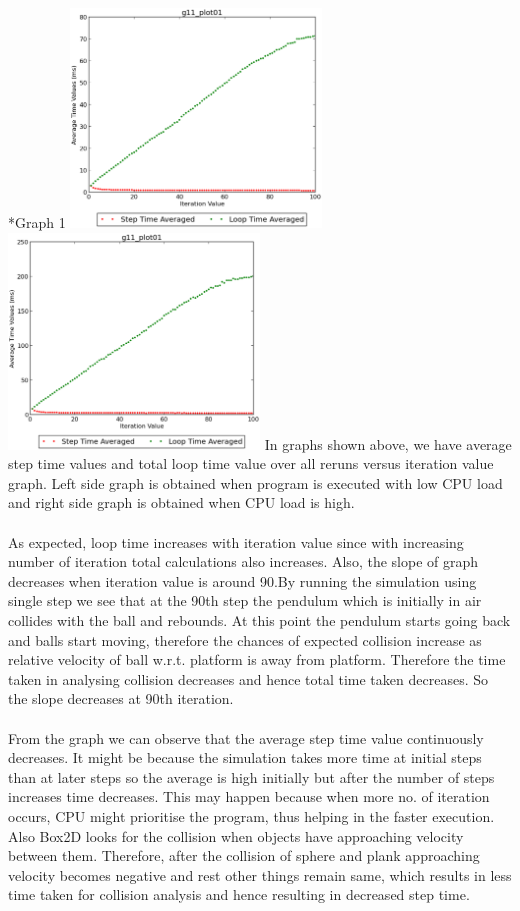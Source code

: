 \documentclass[11pt]{article}
\begin{document}
\begin{subsection}*{Graph 1}
\includegraphics[width=0.5\textwidth,keepaspectratio]{1.eps} \includegraphics[width=0.5\textwidth,keepaspectratio]{load_1.eps}
In graphs shown above, we have average step time values and total loop time value over all reruns versus iteration value graph. Left side graph is obtained when program is executed with low CPU load and right side graph is obtained when CPU load is high.
\\\\ 
As expected, loop time increases with iteration value since with increasing number of iteration total calculations also increases. Also, the slope of graph decreases when iteration value is around 90.By running the simulation using single step we see that at the 90th step the pendulum which is initially in air collides with the ball and rebounds. At this point the pendulum starts going back and balls start moving, therefore the chances of expected collision increase as relative velocity of ball w.r.t. platform is away from platform. Therefore the time taken in analysing collision decreases and hence total time taken decreases. So the slope decreases at 90th iteration.
\\\\
From the graph we can observe that the average step time value continuously decreases. It might be because the simulation takes more time at initial steps than at later steps so the average is high initially but after the number of steps increases time decreases. This may happen because when more no. of iteration occurs, CPU might prioritise the program, thus helping in the faster execution. Also Box2D looks for the collision when objects have approaching velocity between them. Therefore, after the collision of sphere and plank approaching velocity becomes negative and rest other things remain same, which results in less time taken for collision analysis and hence resulting in decreased step time.

\end{subsection}
\end{document}
